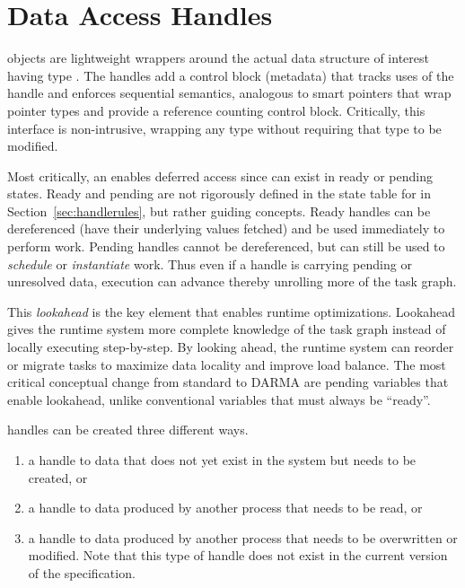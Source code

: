 

\section{Data Access Handles}
\label{sec:handles}
 objects are lightweight wrappers around the actual
data structure of interest having type . 
The \glspl{handle} add a control block (metadata) that tracks uses of the \gls{handle} and enforces
\gls{sequential semantics}, analogous to smart pointers that wrap pointer types and provide a reference counting control block.
Critically, this interface is non-intrusive, wrapping any type  without requiring that type to be modified.

Most critically, an  enables deferred access since \ahandle can exist in ready or pending states. 
Ready and pending are not rigorously defined in the state table for \ahandle in
Section~\ref{sec:handlerules}, but rather guiding concepts.
Ready \glspl{handle} can be dereferenced (have their underlying values
\gls{fetch}ed) and be used immediately to perform work.
Pending \glspl{handle} cannot be dereferenced, but can still be used to \emph{schedule} or \emph{instantiate} work.
Thus even if a \gls{handle} is carrying pending or unresolved data, execution can advance thereby unrolling more of the task graph.

This \emph{lookahead} is the key element that enables runtime optimizations.
Lookahead gives the \gls{runtime system} more complete knowledge of the task graph instead of locally executing step-by-step.
By looking ahead, the \gls{runtime system} can reorder or migrate \glspl{task} to maximize data locality and improve load balance.
The most critical conceptual change from standard \CC{} to \gls{DARMA} are
pending variables that enable lookahead, unlike conventional \CC{} variables that must always be ``ready''.

\Glspl{handle} can be created three different ways.
\begin{enumerate}
  \item a \gls{handle} to data that does not yet exist in the system
but needs to be created, or
\item a \gls{handle} to data produced by another process that needs to
be read, or 
\item a \gls{handle} to data produced by another process that needs to be overwritten or modified. 
  Note that this type of \gls{handle} does not exist in the current version of
  the specification.
\end{enumerate}

